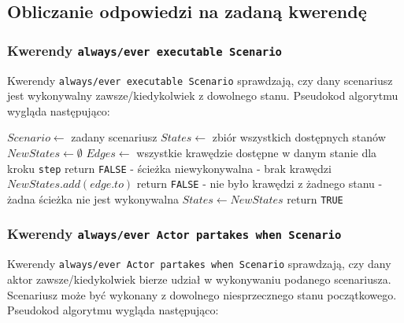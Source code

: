\documentclass{article}
\begin{document}
\subsection{Obliczanie odpowiedzi na zadaną kwerendę}

\subsubsection{Kwerendy \texttt{always/ever executable Scenario}}

Kwerendy \texttt{always/ever executable Scenario} sprawdzają, czy dany scenariusz jest wykonywalny zawsze/kiedykolwiek z dowolnego stanu. Pseudokod algorytmu wygląda następująco:

\begin{algorithm}[H]
\begin{algorithmic}
\State $Scenario \gets $ zadany scenariusz
\State $States \gets $ zbiór wszystkich dostępnych stanów
    \State $NewStates \gets \emptyset$
        \State $Edges \gets $ wszystkie krawędzie dostępne w danym stanie dla kroku \texttt{step}
        	\State return \texttt{FALSE} - ścieżka niewykonywalna - brak krawędzi
        \EndIf
            \State $NewStates.add(edge.to)$
        \EndFor
    \EndFor
        \State return \texttt{FALSE} - nie było krawędzi z żadnego stanu - żadna ścieżka nie jest wykonywalna
    \EndIf
    \State $States \gets NewStates$
\EndFor
\State return \texttt{TRUE}

\end{algorithmic}
\end{algorithm}

\newpage
\subsubsection{Kwerendy \texttt{always/ever Actor partakes when Scenario}}

Kwerendy \texttt{always/ever Actor partakes when Scenario} sprawdzają, czy dany aktor zawsze/kiedykolwiek bierze udział w wykonywaniu podanego scenariusza. Scenariusz może być wykonany z dowolnego niesprzecznego stanu początkowego. Pseudokod algorytmu wygląda następująco:
\end{document}
